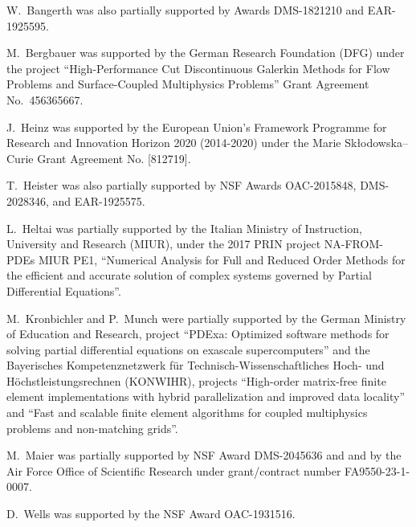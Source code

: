 \documentclass{ansarticle-preprint}
\begin{document}
W.~Bangerth was also partially supported by Awards DMS-1821210 and EAR-1925595.

M.~Bergbauer was supported by the German Research Foundation (DFG) under the
project ``High-Performance Cut Discontinuous Galerkin Methods for Flow
Problems and Surface-Coupled Multiphysics Problems'' Grant Agreement
No.~456365667.


J.~Heinz was supported by the European Union’s Framework Programme for Research
and Innovation Horizon 2020 (2014-2020) under the Marie Sk\l{}odowska--Curie Grant
Agreement No. [812719].

T.~Heister was also partially supported by NSF
Awards OAC-2015848, DMS-2028346, and
EAR-1925575.

L.~Heltai was partially supported by the Italian Ministry of Instruction,
University and Research (MIUR), under the 2017 PRIN project NA-FROM-PDEs MIUR
PE1, ``Numerical Analysis for Full and Reduced Order Methods for the efficient
and accurate solution of complex systems governed by Partial Differential
Equations''.

M.~Kronbichler and P.~Munch were partially supported by the
German Ministry of Education and Research, project
``PDExa: Optimized software methods for solving partial differential
equations on exascale supercomputers'' and the Bayerisches Kompetenznetzwerk
f\"ur Technisch-Wissen\-schaft\-li\-ches Hoch- und H\"ochstleistungsrechnen
(KONWIHR), projects ``High-order matrix-free finite
element implementations with hybrid parallelization and improved data
locality'' and ``Fast and scalable finite element algorithms for coupled
multiphysics problems and non-matching grids''.

M.~Maier was partially supported by NSF Award DMS-2045636 and and by the
Air Force Office of Scientific Research under grant/contract number
FA9550-23-1-0007.

D.~Wells was supported by the NSF Award OAC-1931516.




{}

\end{document}
